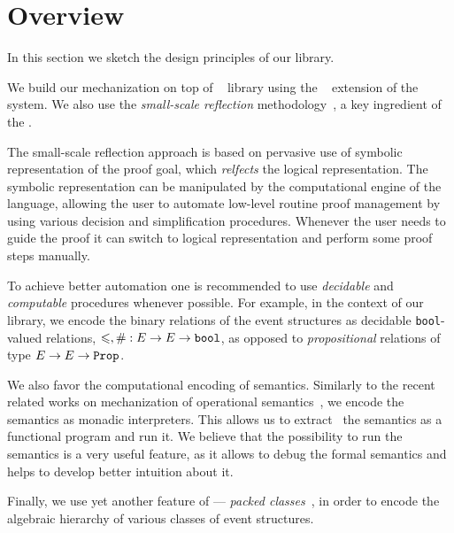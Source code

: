 \section{Overview}

In this section we sketch the design principles of our library. 

We build our mechanization on top of \mathcomp~\cite{Mahboubi-Tassi:MATHCOMP17} library 
using the \ssreflect~\cite{Gonthier-al:SSR2016} extension of the \coq system.
We also use the \emph{small-scale reflection} 
methodology~\cite{Gonthier-Assia:SSR2010, Gonthier-al:SSR2016}, 
a key ingredient of the \ssreflect. 

The small-scale reflection approach is based on 
pervasive use of symbolic representation of the proof goal, 
which \emph{relfects} the logical representation. 
The symbolic representation can be manipulated 
by the computational engine of the language, 
allowing the user to automate low-level routine 
proof management by using various decision 
and simplification procedures. 
Whenever the user needs to guide the proof 
it can switch to logical representation
and perform some proof steps manually. 

To achieve better automation one is recommended 
to use \emph{decidable} and \emph{computable} procedures
whenever possible.
For example, in the context of our library, 
we encode the binary relations of the event structures
as decidable \texttt{bool}-valued relations, 
\ie $\leqslant, \# : E \rightarrow E \rightarrow \texttt{bool}$,
as opposed to \emph{propositional} 
relations of type $E \rightarrow E \rightarrow \texttt{Prop}$. 

We also favor the computational encoding of semantics. 
Similarly to the recent related works on mechanization 
of operational semantics~\cite{Xia-al:POPL2019, Letan-al:CPP2020, Affeldt-al:ICMPC2019}, 
we encode the semantics as monadic interpreters.  
This allows us to extract~\cite{Letouzey:CCE2008} 
the semantics as a functional program and run it. 
We believe that the possibility to run the semantics 
is a very useful feature, as it allows 
to debug the formal semantics
and helps to develop better intuition about it.

Finally, we use yet another feature of \mathcomp --- 
\emph{packed classes}~\cite{Garillot-al:ICTPHOL2009}, 
in order to encode the algebraic hierarchy
of various classes of event structures. 